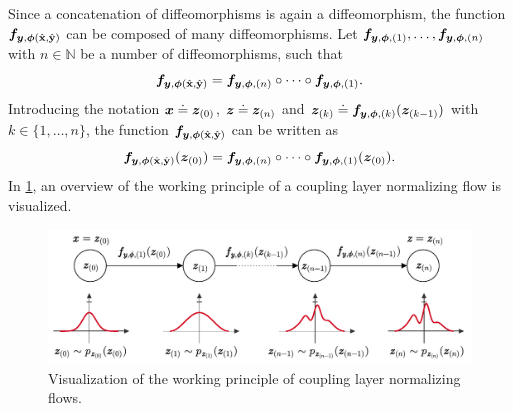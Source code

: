 \documentclass[a4paper,12pt]{report}
\def\lk#1{{\color{black}{#1}}}
\begin{document}
Since a concatenation of diffeomorphisms is again a diffeomorphism, the function $\bm{f}_{\bm{y},\bm{\phi}(\hat{\boldsymbol{\mathbf{x}}},\hat{\boldsymbol{\mathbf{y}}})}$ can be composed of many \lk{individual} diffeomorphisms. Let $\bm{f}_{\bm{y},\bm{\phi},(1)}, \dots, \bm{f}_{\bm{y},\bm{\phi},(n)}$ with $n \in \mathbb{N}$ be a number of diffeomorphisms, such that \begin{equation}
\bm{f}_{\bm{y},\bm{\phi}(\hat{\boldsymbol{\mathbf{x}}},\hat{\boldsymbol{\mathbf{y}}})} = \bm{f}_{\bm{y},\bm{\phi},(n)}\circ \dots \circ \bm{f}_{\bm{y},\bm{\phi},(1)}.
\end{equation} Introducing the notation $\bm{x} \doteq \bm{z}_{(0)}$, $\bm{z} \doteq \bm{z}_{(n)}$ and $\bm{z}_{(k)} \doteq \bm{f}_{\bm{y},\bm{\phi},(k)}(\bm{z}_{(k-1)})$ with $k \in \{1,\dots,n\}$, the function $\bm{f}_{\bm{y},\bm{\phi}(\hat{\boldsymbol{\mathbf{x}}},\hat{\boldsymbol{\mathbf{y}}})}$ can be written as \begin{equation}
\bm{f}_{\bm{y},\bm{\phi}(\hat{\boldsymbol{\mathbf{x}}},\hat{\boldsymbol{\mathbf{y}}})}(\bm{z}_{(0)}) = \bm{f}_{\bm{y},\bm{\phi},(n)}\circ \dots\circ \bm{f}_{\bm{y},\bm{\phi},(1)}(\bm{z}_{(0)}).
\end{equation} 
In \cref{fig:normflows}, an overview of the working principle of a coupling layer normalizing flow is visualized.
\begin{figure}[h!]
\centering
\includegraphics[width=\textwidth]{figures/normflows.pdf}
\caption{Visualization of the working principle of coupling layer normalizing flows.}
\label{fig:normflows}
\end{figure}
\end{document}
